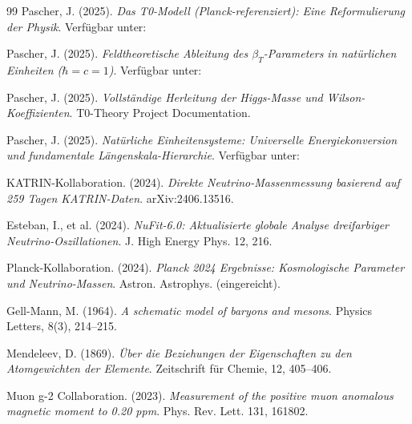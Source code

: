 	\begin{thebibliography}{99}
		Pascher, J. (2025). \textit{Das T0-Modell (Planck-referenziert): Eine Reformulierung der Physik}. Verfügbar unter: 
		
		Pascher, J. (2025). \textit{Feldtheoretische Ableitung des $\beta_T$-Parameters in natürlichen Einheiten ($\hbar = c = 1$)}. Verfügbar unter: 
		
		Pascher, J. (2025). \textit{Vollständige Herleitung der Higgs-Masse und Wilson-Koeffizienten}. T0-Theory Project Documentation.
		
		Pascher, J. (2025). \textit{Natürliche Einheitensysteme: Universelle Energiekonversion und fundamentale Längenskala-Hierarchie}. Verfügbar unter: 
		
		KATRIN-Kollaboration. (2024). \textit{Direkte Neutrino-Massenmessung basierend auf 259 Tagen KATRIN-Daten}. arXiv:2406.13516.
		
		Esteban, I., et al. (2024). \textit{NuFit-6.0: Aktualisierte globale Analyse dreifarbiger Neutrino-Oszillationen}. J. High Energy Phys. 12, 216.
		
		Planck-Kollaboration. (2024). \textit{Planck 2024 Ergebnisse: Kosmologische Parameter und Neutrino-Massen}. Astron. Astrophys. (eingereicht).
		
		Gell-Mann, M. (1964). \textit{A schematic model of baryons and mesons}. Physics Letters, 8(3), 214--215.
		
		Mendeleev, D. (1869). \textit{Über die Beziehungen der Eigenschaften zu den Atomgewichten der Elemente}. Zeitschrift für Chemie, 12, 405--406.
		
		Muon g-2 Collaboration. (2023). \textit{Measurement of the positive muon anomalous magnetic moment to 0.20 ppm}. Phys. Rev. Lett. 131, 161802.
		
	\end{thebibliography}
